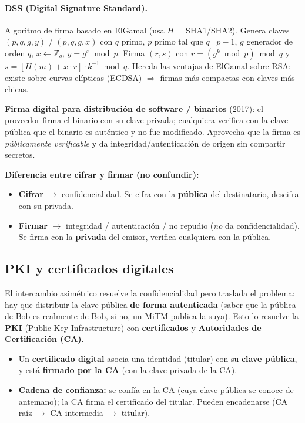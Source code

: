 \documentclass[../main.tex]{subfiles}
\begin{document}
\paragraph{DSS (Digital Signature Standard).} Algoritmo de firma basado en ElGamal
(usa $H$ = SHA1/SHA2). Genera claves $(p,q,g,y)$ / $(p,q,g,x)$ con $q$ primo,
$p$ primo tal que $q\mid p-1$, $g$ generador de orden $q$, $x\leftarrow\mathbb{Z}_q$,
$y=g^x\bmod p$. Firma $(r,s)$ con $r=(g^k\bmod p)\bmod q$ y
$s=[H(m)+x\cdot r]\cdot k^{-1}\bmod q$. Hereda las ventajas de ElGamal sobre RSA:
existe sobre curvas elípticas (ECDSA) $\Rightarrow$ firmas más compactas con claves
más chicas.

\begin{examen}
\textbf{Firma digital para distribución de software / binarios} (2017): el
proveedor firma el binario con su clave privada; cualquiera verifica con la clave
pública que el binario es auténtico y no fue modificado. Aprovecha que la firma es
\emph{públicamente verificable} y da integridad/autenticación de origen sin
compartir secretos.
\end{examen}

\begin{ojo}
\textbf{Diferencia entre cifrar y firmar (no confundir):}
\begin{itemize}[leftmargin=1.4em,nosep]
  \item \textbf{Cifrar} $\to$ confidencialidad. Se cifra con la \textbf{pública}
  del destinatario, descifra con su privada.
  \item \textbf{Firmar} $\to$ integridad / autenticación / no repudio
  (\emph{no} da confidencialidad). Se firma con la \textbf{privada} del emisor,
  verifica cualquiera con la pública.
\end{itemize}
\end{ojo}

\subsection{PKI y certificados digitales}

El intercambio asimétrico resuelve la confidencialidad pero traslada el problema:
hay que distribuir la clave pública \textbf{de forma autenticada} (saber que la
pública de Bob es realmente de Bob, si no, un MiTM publica la suya). Esto lo
resuelve la \textbf{PKI} (Public Key Infrastructure) con \textbf{certificados} y
\textbf{Autoridades de Certificación (CA)}.

\begin{itemize}[leftmargin=1.4em]
  \item Un \textbf{certificado digital} asocia una identidad (titular) con su
  \textbf{clave pública}, y está \textbf{firmado por la CA} (con la clave privada
  de la CA).
  \item \textbf{Cadena de confianza:} se confía en la CA (cuya clave pública se
  conoce de antemano); la CA firma el certificado del titular. Pueden encadenarse
  (CA raíz $\to$ CA intermedia $\to$ titular).
\end{itemize}
\end{document}
